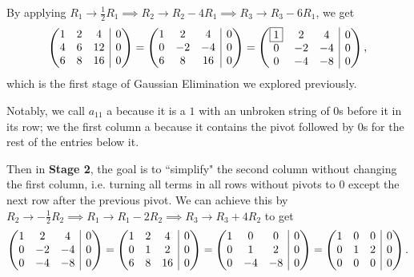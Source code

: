 \documentclass[main.tex]{subfiles}
\begin{document}
By applying $R_1\to \frac{1}{2}R_1\implies R_2\to R_2 - 4R_1\implies R_3\to R_3 - 6R_1$, we get
\[\left(\begin{array}{@{}c c c | c@{}}
    1 & 2 & 4 & 0 \\
    4 & 6 & 12 & 0 \\
    6 & 8 & 16 & 0
\end{array}
\right) = \left(\begin{array}{@{}c c c | c@{}}
    1 & 2 & 4 & 0 \\
    0 & -2 & -4 & 0 \\
    6 & 8 & 16 & 0
\end{array}
\right) = \left(\begin{array}{@{}c c c | c@{}}
    \boxed{1} & 2 & 4 & 0 \\
    0 & -2 & -4 & 0 \\
    0 & -4 & -8 & 0
\end{array}
\right),\]
which is the first stage of Gaussian Elimination we explored previously.
\begin{definition}
Notably, we call $a_{11}$ a  because it is a $1$ with an unbroken string of $0$s before it in its row; we the first column a  because it contains the pivot followed by $0$s for the rest of the entries below it.
\end{definition}
Then in \textbf{Stage 2}, the goal is to ``simplify" the second column without changing the first column, i.e. turning all terms in all rows without pivots to 0 except the next row after the previous pivot. We can achieve this by $R_2\to -\frac{1}{2}R_2\implies R_1\to R_1 - 2R_2\implies R_3\to R_3 + 4R_2$ to get
\[\left(\begin{array}{@{}c c c | c@{}}
    1 & 2 & 4 & 0 \\
    0 & -2 & -4 & 0 \\
    0 & -4 & -8 & 0
\end{array}
\right) = \left(\begin{array}{@{}c c c | c@{}}
    1 & 2 & 4 & 0 \\
    0 & 1 & 2 & 0 \\
    6 & 8 & 16 & 0
\end{array}
\right) = \left(\begin{array}{@{}c c c | c@{}}
    1 & 0 & 0 & 0 \\
    0 & 1 & 2 & 0 \\
    0 & -4 & -8 & 0
\end{array}
\right) = \left(\begin{array}{@{}c c c | c@{}}
    1 & 0 & 0 & 0 \\
    0 & 1 & 2 & 0 \\
    0 & 0 & 0 & 0
\end{array}
\right).\]
\end{document}

